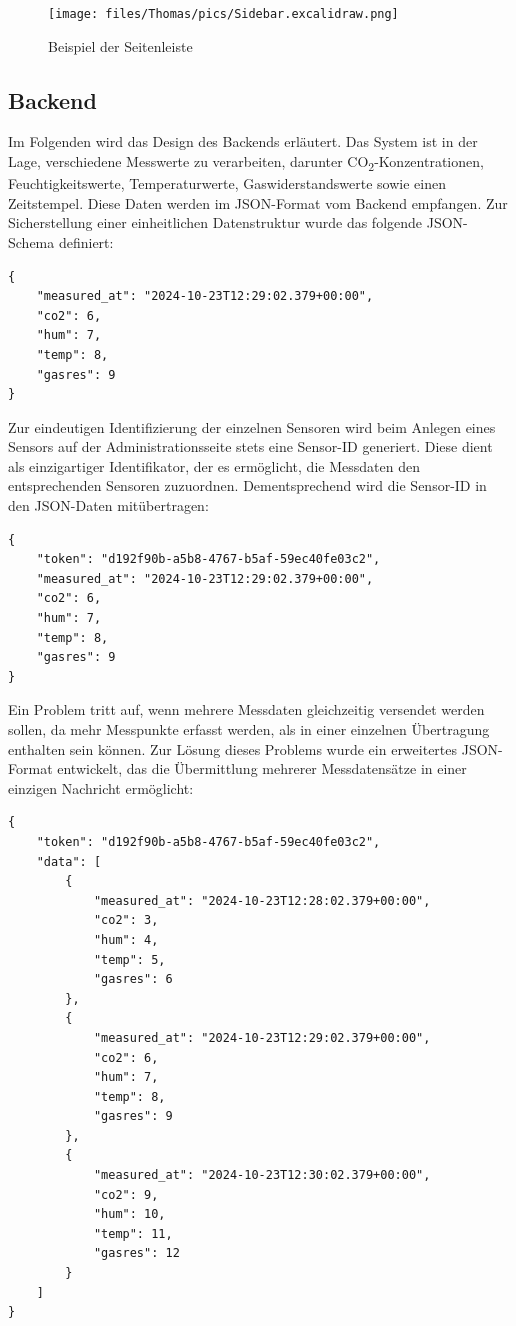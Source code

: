 \begin{inhalt}
\begin{figure}[!htb] 
\centering 
\texttt{[image: files/Thomas/pics/Sidebar.excalidraw.png]} 
\caption[Bildbezeichnung für Abbildungsverzeichnis]{Beispiel der Seitenleiste} 
\label{fig:gehaeuse_internet_bild} 
\end{figure}

\subsection{Backend}

Im Folgenden wird das Design des Backends erläutert. Das System ist in der Lage, verschiedene Messwerte zu verarbeiten, darunter CO\textsubscript{2}-Konzentrationen, Feuchtigkeitswerte, Temperaturwerte, Gaswiderstandswerte sowie einen Zeitstempel. Diese Daten werden im JSON-Format vom Backend empfangen. Zur Sicherstellung einer einheitlichen Datenstruktur wurde das folgende JSON-Schema definiert:

\begin{lstlisting}[style=myjson]
{
    "measured_at": "2024-10-23T12:29:02.379+00:00",
    "co2": 6,
    "hum": 7,
    "temp": 8,
    "gasres": 9
}
\end{lstlisting}

Zur eindeutigen Identifizierung der einzelnen Sensoren wird beim Anlegen eines Sensors auf der Administrationsseite stets eine Sensor-ID generiert. Diese dient als einzigartiger Identifikator, der es ermöglicht, die Messdaten den entsprechenden Sensoren zuzuordnen. Dementsprechend wird die Sensor-ID in den JSON-Daten mitübertragen:

\begin{lstlisting}[style=myjson]
{
    "token": "d192f90b-a5b8-4767-b5af-59ec40fe03c2",
    "measured_at": "2024-10-23T12:29:02.379+00:00",
    "co2": 6,
    "hum": 7,
    "temp": 8,
    "gasres": 9
}
\end{lstlisting}

Ein Problem tritt auf, wenn mehrere Messdaten gleichzeitig versendet werden sollen, da mehr Messpunkte erfasst werden, als in einer einzelnen Übertragung enthalten sein können. Zur Lösung dieses Problems wurde ein erweitertes JSON-Format entwickelt, das die Übermittlung mehrerer Messdatensätze in einer einzigen Nachricht ermöglicht:

\begin{lstlisting}[style=myjson]
{
    "token": "d192f90b-a5b8-4767-b5af-59ec40fe03c2",
    "data": [
        {
            "measured_at": "2024-10-23T12:28:02.379+00:00",
            "co2": 3,
            "hum": 4,
            "temp": 5,
            "gasres": 6
        },
        {
            "measured_at": "2024-10-23T12:29:02.379+00:00",
            "co2": 6,
            "hum": 7,
            "temp": 8,
            "gasres": 9
        },
        {
            "measured_at": "2024-10-23T12:30:02.379+00:00",
            "co2": 9,
            "hum": 10,
            "temp": 11,
            "gasres": 12
        }
    ]
}
\end{lstlisting}


\end{inhalt}
